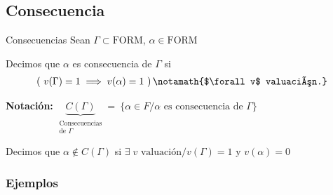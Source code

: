 \subsection{Consecuencia}

\begin{definicion}{Consecuencias}{}
    Sean $\Gamma \subset \mathrm{FORM}$, $\alpha \in \mathrm{FORM}$

    \medskip

    Decimos que $\alpha$ es consecuencia de $\Gamma$ si
    \begin{gather*}
        \left( ~ v(\Gamma)=1 \implies v(\alpha) = 1 ~ \right) 
        \notamath{$\forall v$ valuación.}
    \end{gather*}

    \bigskip
    \textbf{Notación:}
    $\underbrace{C(\Gamma)}_{\substack{
        \text{Consecuencias}\\\text{de } \Gamma}}
    = ~ \{\alpha \in F / \alpha \text{ es consecuencia de } \Gamma\}$
\end{definicion}

Decimos que $\alpha \notin C(\Gamma)$ si
$\exists \; v \text{ valuación}/ v(\Gamma) = 1 \text{ y } v(\alpha) = 0$

\subsubsection{Ejemplos}

